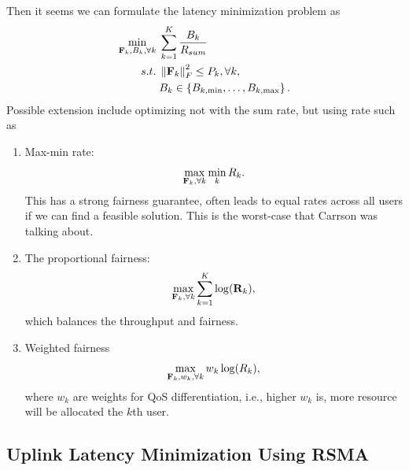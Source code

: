 \documentclass[a4paper, 12pt, onecolumn, journal, twoside, draftclsnofoot]{IEEEtran}
\begin{document}
Then it seems we can formulate the latency minimization problem as
\begin{equation}
	\begin{split}
		\min_{{\bf F}_k, B_k, \forall k}  &\;  \sum_{k=1}^K  \frac{ B_k } { R_{sum}  }  \\
		s.t. &\;  \left\| {\bf F}_k \right\|_F^2  \leq P_k,  \forall k, \\
		&\; B_k \in \left\{  B_{k,\min}, \ldots, B_{k,\max} \right\}.
	\end{split}
\label{eq_prob_form_basic}
\end{equation}
Possible extension include optimizing not with the sum rate, but using rate such as
\begin{enumerate}[1.]
	\item Max-min rate: 
	\begin{equation*}
		\max_{{\bf F}_k, \forall k}  \min_k  R_k.
	\end{equation*}
This has a strong fairness guarantee, often leads to equal rates across all users if we can find a feasible solution.  This is the worst-case that Carrson was talking about.
	\item The proportional fairness:
	\begin{equation*}
		\max_{{\bf F}_k, \forall k}   \sum_{k=1}^K  \log ({\bf R}_k), 
	\end{equation*}
which balances the throughput and fairness. 
	\item Weighted fairness 
	\begin{equation*}
		\max_{{\bf F}_k, w_k, \forall k}  w_k \log (R_k), 
	\end{equation*}
where $w_k$ are weights for QoS differentiation, i.e., higher $w_k$ is, more resource will be allocated the $k$th user.
\end{enumerate}


\subsection{Uplink Latency Minimization Using RSMA}
 
\end{document}

